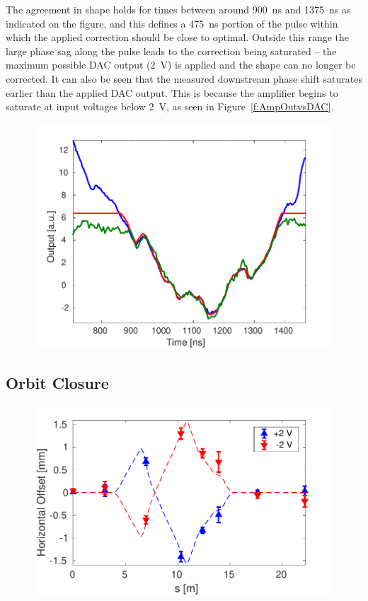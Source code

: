 \documentclass[%
 reprint,
 superscriptaddress,
 amsmath,
 amssymb,
 prstab,
]{revtex4-1}
\begin{document}
The agreement in shape holds for times between around 900~ns and 1375~ns as 
indicated on the figure, and this defines a 475~ns portion of the pulse within 
which the applied correction should be close to optimal. Outside this range the 
large phase sag along the pulse leads 
to the correction being saturated -- the maximum possible DAC output 
(2~V) is applied and the shape can no longer be corrected. It can also
be seen that the measured downstream phase shift saturates earlier than
the applied DAC output. This is because the amplifier begins to 
saturate at input voltages below 2~V, as seen in Figure~\ref{f:AmpOutvsDAC}.

\begin{figure}
	\includegraphics[width=\columnwidth]{figs/comis/pffKickShape} 
	\caption{\label{f:pffKickShape}
	}
\end{figure}

\subsection{\label{ss:orbClos}Orbit Closure}

\begin{figure}
	\includegraphics[width=\columnwidth]{figs/optics/orbClos}%
	\caption{\label{f:orbClos}
	}
\end{figure}
\end{document}
